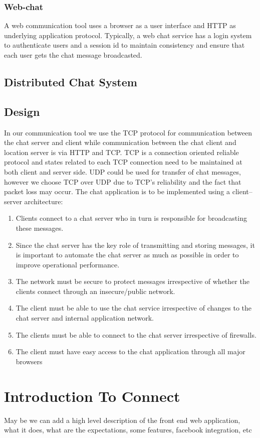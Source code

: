 \documentclass[12pt]{article}
\begin{document}
\subsubsection{Web-chat}
A web communication tool uses a browser as a user interface and HTTP as underlying application protocol. Typically, a web chat service has a login system to authenticate users and a session id to maintain consistency and ensure that each user gets the chat message broadcasted.
\subsection{Distributed Chat System}
\subsection{Design}
In our communication tool we use the TCP protocol for communication between the chat server and client while communication between the chat client and location server is via HTTP and TCP. TCP is a connection oriented reliable protocol and states related to each TCP connection need to be maintained at both client and server side. UDP could be used for transfer of chat messages, however we choose TCP over UDP due to TCP's reliability and the fact that packet loss may occur. 
The chat application is to be implemented using a client–server architecture:
\begin{enumerate}
\item Clients connect to a chat server who in turn is responsible for broadcasting these messages.
\item Since the chat server has the key role of transmitting and storing
messages, it is important to automate the chat server as much as possible in
order to improve operational performance.
\item The network must be secure to protect messages irrespective of whether the
clients connect through an insecure/public network.
\item The client must be able to use the chat service irrespective of changes to
the chat server and internal application network.
\item The clients must be able to connect to the chat server irrespective of
firewalls.
\item The client must have easy access to the chat application through all major
browsers
\end{enumerate}
\section {Introduction To Connect}
May be we can add a high level description of the front end web application, what it does, what are the expectations, some features, facebook integration, etc 
\end{document}
